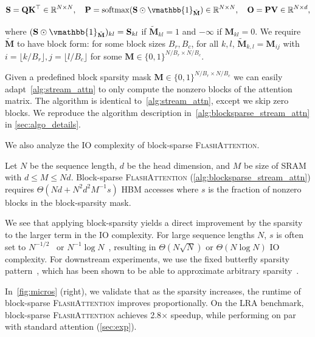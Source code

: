 \begin{equation*}
  \mathbf{S} = \mathbf{Q} \mathbf{K}^\top \in \mathbb{R}^{N \times N}, \quad \mathbf{P} = \mathrm{softmax}(\mathbf{S} \odot \vmathbb{1}_{\tilde{\mathbf{M}}}) \in \mathbb{R}^{N \times N}, \quad \mathbf{O} = \mathbf{P}\mathbf{V} \in \mathbb{R}^{N \times d},
\end{equation*}

where $(\mathbf{S} \odot \vmathbb{1}_{\tilde{\mathbf{M}}})_{kl} = \mathbf{S}_{kl}$ if
$\tilde{\mathbf{M}}_{kl} = 1$ and $-\infty$ if $\mathbf{M}_{kl} = 0$. We require $\tilde{\mathbf{M}}$ to have block form: for some block sizes $B_r, B_c$, for all $k, l$, $\tilde{\mathbf{M}}_{k, l} = \mathbf{M}_{ij}$ with $i = \lfloor k / B_r \rfloor, j = \lfloor l / B_c \rfloor$ for some $\mathbf{M} \in \{ 0, 1 \}^{N/B_r \times N/B_c}$.

Given a predefined block sparsity mask $\mathbf{M} \in \{ 0, 1 \}^{N/B_r \times N/B_c}$ we can easily adapt~\ref{alg:stream_attn} to only compute the nonzero blocks of the attention matrix. The algorithm is identical to~\ref{alg:stream_attn}, except we skip zero blocks. We reproduce the algorithm description in~\ref{alg:blocksparse_stream_attn} in
\ref{sec:algo_details}.

We also analyze the IO complexity of block-sparse \textsc{FlashAttention}.

\begin{proposition}\label{thm:io_complexity_blocksparse}
  Let $N$ be the sequence length, $d$ be the head dimension, and $M$ be size of SRAM with $d \leq M \leq Nd$. Block-sparse \textsc{FlashAttention} (\ref{alg:blocksparse_stream_attn}) requires
  $\Theta ( Nd + N^2 d^2 M^{-1} s )$ HBM accesses where $s$ is the fraction of nonzero blocks in the block-sparsity mask.
\end{proposition}

We see that applying block-sparsity yields a direct improvement by the sparsity to the larger term in the IO complexity. For large sequence lengths $N$, $s$ is often set to $N^{-1/2}$~\citep{child2019generating} or
$N^{-1}\log N$~\citep{zaheer2020bigbird, beltagy2020longformer, dao2021pixelated}, resulting in $\Theta(N\sqrt{N})$ or
$\Theta(N \log N)$ IO complexity. For downstream experiments, we use the fixed butterfly sparsity pattern~\citep{dao2021pixelated}, which has been shown to be able to approximate arbitrary sparsity~\citep{dao2020kaleidoscope}.

In~\ref{fig:micros} (right), we validate that as the sparsity increases, the runtime of block-sparse \textsc{FlashAttention} improves proportionally. On the LRA benchmark, block-sparse \textsc{FlashAttention} achieves 2.8$\times$
speedup, while performing on par with standard attention (\ref{sec:exp}).

